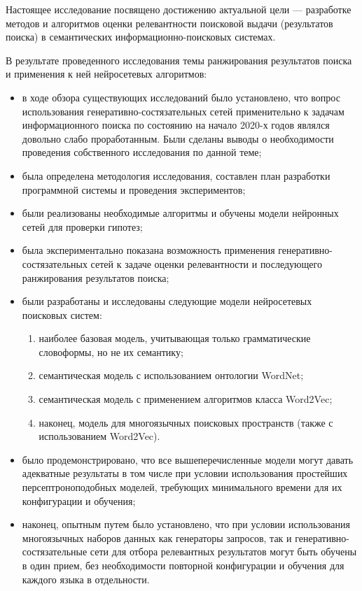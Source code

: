 Настоящее исследование посвящено достижению актуальной цели --- разработке методов и алгоритмов
оценки релевантности поисковой выдачи (результатов поиска) в семантических информационно-поисковых системах.

В результате проведенного исследования темы ранжирования результатов поиска и применения к ней нейросетевых алгоритмов:
\begin{itemize}
    \item в ходе обзора существующих исследований было установлено, что вопрос использования генеративно-состязательных
          сетей применительно к задачам информационного поиска по состоянию на начало 2020-х годов являлся довольно слабо проработанным.
          Были сделаны выводы о необходимости проведения собственного исследования по данной теме;
    \item была определена методология исследования, составлен план разработки программной системы и проведения экспериментов;
    \item были реализованы необходимые алгоритмы и обучены модели нейронных сетей для проверки гипотез;
    \item была экспериментально показана возможность применения генеративно-состязательных сетей к задаче оценки релевантности
          и последующего ранжирования результатов поиска;
    \item были разработаны и исследованы следующие модели нейросетевых поисковых систем: 
          \begin{enumerate}[1)]
              \item наиболее базовая модель, учитывающая только грамматические словоформы, но не их семантику;
              \item семантическая модель с использованием онтологии WordNet;
              \item семантическая модель с применением алгоритмов класса Word2Vec;
              \item наконец, модель для многоязычных поисковых пространств (также с использованием Word2Vec).
          \end{enumerate}
    \item было продемонстрировано, что все вышеперечисленные модели могут давать адекватные результаты в том числе при условии использования
          простейших персептроноподобных моделей, требующих минимального времени для их конфигурации и обучения;
    \item наконец, опытным путем было установлено, что при условии использования многоязычных наборов данных как генераторы запросов, так и 
          генеративно-состязательные сети для отбора релевантных результатов могут быть обучены в один прием, без необходимости
          повторной конфигурации и обучения для каждого языка в отдельности.
\end{itemize}

